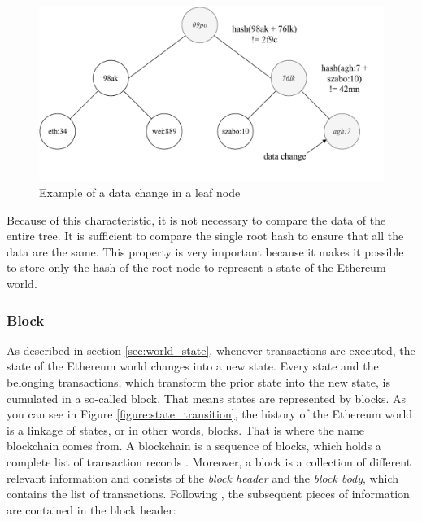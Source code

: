 \begin{figure}[htbp]
	\centering
	\includegraphics[width=.8\linewidth]{./figures/merkle_tree_change.pdf}
	\caption{Example of a data change in a leaf node}
	\label{figure:merkle_tree_change}
\end{figure}

Because of this characteristic, it is not necessary to compare the data of the entire tree. 
It is sufficient to compare the single root hash to ensure that all the data are the same. 
This property is very important because it makes it possible to store only the hash of 
the root node to represent a state of the Ethereum world. 

\subsubsection{Block} 
\label{sec:block}
As described in section \ref{sec:world_state}, whenever transactions are executed, 
the state of the Ethereum world changes into a new state. 
Every state and the belonging transactions, which transform the prior state into 
the new state, is cumulated in a so-called block. That means states are represented 
by blocks. As you can see in Figure \ref{figure:state_transition}, the history of 
the Ethereum world is a linkage of states, or in other words, blocks. 
That is where the name blockchain comes from. A blockchain is a sequence 
of blocks, which holds a complete list of transaction records . 
Moreover, a block is a collection of different relevant information and 
consists of the \textit{block header} and the \textit{block body}, 
which contains the list of transactions. Following , 
the subsequent pieces of information are contained in the block header:

